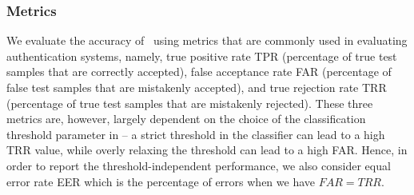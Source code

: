 \subsubsection{Metrics}
We evaluate the accuracy of \systemname~using metrics that are commonly used in evaluating authentication systems, namely,
true positive rate TPR (percentage of true test samples that are
correctly accepted), false acceptance rate FAR (percentage of false test samples that are
mistakenly accepted), and true rejection rate TRR (percentage of true test
samples that are mistakenly rejected). These three metrics are, however, largely dependent on the choice of the classification threshold  parameter in \systemname --
a strict threshold in the classifier can lead to a high TRR value, while
overly relaxing the threshold can lead to a high FAR. Hence, in order to report the threshold-independent performance, we also consider equal error rate EER which is the percentage of errors when we have $FAR = TRR$.



